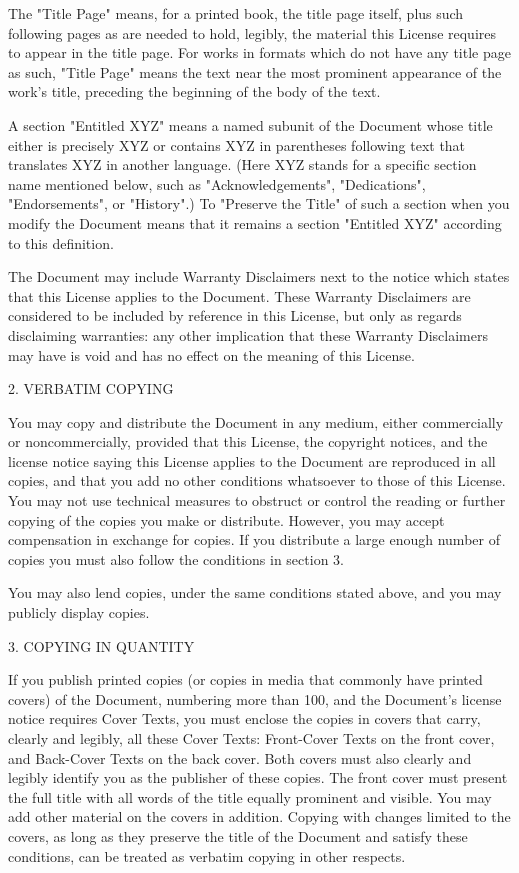 \documentclass[oneside,english,a4paper,10pt,oneside,openany,final]{memoir}
\begin{document}
The "Title Page" means, for a printed book, the title page itself, plus such following pages as are needed to hold, legibly, the material this License requires to appear in the title page. For works in formats which do not have any title page as such, "Title Page" means the text near the most prominent appearance of the work's title, preceding the beginning of the body of the text.

A section "Entitled XYZ" means a named subunit of the Document whose title either is precisely XYZ or contains XYZ in parentheses following text that translates XYZ in another language. (Here XYZ stands for a specific section name mentioned below, such as "Acknowledgements", "Dedications", "Endorsements", or "History".) To "Preserve the Title" of such a section when you modify the Document means that it remains a section "Entitled XYZ" according to this definition.

The Document may include Warranty Disclaimers next to the notice which states that this License applies to the Document. These Warranty Disclaimers are considered to be included by reference in this License, but only as regards disclaiming warranties: any other implication that these Warranty Disclaimers may have is void and has no effect on the meaning of this License.

2. VERBATIM COPYING

You may copy and distribute the Document in any medium, either commercially or noncommercially, provided that this License, the copyright notices, and the license notice saying this License applies to the Document are reproduced in all copies, and that you add no other conditions whatsoever to those of this License. You may not use technical measures to obstruct or control the reading or further copying of the copies you make or distribute. However, you may accept compensation in exchange for copies. If you distribute a large enough number of copies you must also follow the conditions in section 3.

You may also lend copies, under the same conditions stated above, and you may publicly display copies.

3. COPYING IN QUANTITY

If you publish printed copies (or copies in media that commonly have printed covers) of the Document, numbering more than 100, and the Document's license notice requires Cover Texts, you must enclose the copies in covers that carry, clearly and legibly, all these Cover Texts: Front-Cover Texts on the front cover, and Back-Cover Texts on the back cover. Both covers must also clearly and legibly identify you as the publisher of these copies. The front cover must present the full title with all words of the title equally prominent and visible. You may add other material on the covers in addition. Copying with changes limited to the covers, as long as they preserve the title of the Document and satisfy these conditions, can be treated as verbatim copying in other respects.
\end{document}
